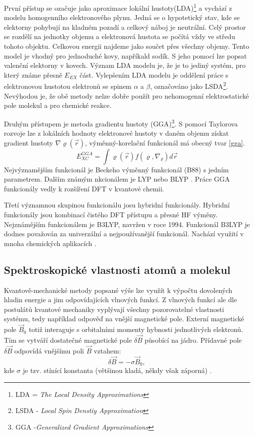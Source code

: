 \documentclass[
  digital, %
  table,   %
  lof,     %
  lot,     %
  oneside,
]{fithesis3}
\begin{document}
První přístup se ozačuje jako aproximace lokální hustoty(LDA)\footnote{LDA = \textit{The Local Density Approximations}} a vychází z modelu homogenního elektronového plynu. Jedná se o hypotetický stav, kde se elektorny pohybují na kladném pozadí a celkový náboj je neutrální. Celý prostor se rozdělí na jednotky objemu a elektronová hustota se počítá vždy ve středu tohoto objektu. Celkovou energii najdeme jako součet přes všechny objemy. Tento model je vhodný pro jednoduché kovy, napříkald sodík. S jeho pomocí lze popsat valenční elektorny v kovech. Význam LDA modelu je, že je to jediný systém, pro který známe přesně $E_{EX}$ část. Vylepšením LDA modelu je oddělení práce s elektronovou hustotou elektronů se spinem $\alpha$ a $\beta$, označováno jako LSDA\footnote{LSDA - \textit{Local Spin Denstiy Approximation}}. Nevýhodou je, že obě metody nelze dobře použít pro nehomogenní elektrostatické pole molekul a pro chemické reakce.

 Druhým přístupem je metoda gradientu hustoty (GGA)\footnote{GGA -\textit{Generalized Gradient Approximations}}. S pomocí Taylorova rozvoje lze z lokálních hodnoty elektronové hustoty v daném objemu získat gradient hustoty $\nabla \varrho(\vec{r})$, výměnný-korelační funkcionál má obecný tvar \ref{gga}.
\begin{equation}
  E_{XC}^{GGA} = \int \varrho(\vec{r})f(\varrho, \nabla_{\varrho})d\vec{r}
  \label{gga}
\end{equation}
 Nejvýznamějším funkcionál je Beckeho výměnný funkcionál (B88) s jedním parametrem. Dalším známým nkcionálem je LYP \cite{lyp} nebo BLYP \cite{blyp}. Práce GGA funkcionály vedly k rozšíření DFT v kvantové chemii.

 Třetí významnou skupinou funkcionálu josu hybridní funkcionály. Hybridní funkcionály jsou kombinací čistého DFT přístupu a přesné HF výměny. Nejznámějším funkcionálem je B3LYP, navržen v roce 1994. Funkcionál B3LYP je dodnes považován za univerzální a nejpoužívanější funkcionál. Nachází využití v mnoha chemických aplikacích \cite{koch2000chemist}.

 \subsection{Spektroskopické vlastnosti atomů a molekul}
 Kvantově-mechanické metody popsané výše lze využít k výpočtu dovolených hladin energie a jim odpovídajících vlnových funkcí. Z vlnových funkcí ale dle postulátů kvantové mechaniky vyplývají všechny pozorovatelné vlastnosti systému, tedy například odpověď na vnější magnetické pole. Externí magnetické pole $\vec{B}_0$ totiž interaguje s orbitalními momenty hybnosti jednotlivých elektronů. Tím se vytváří dostatečné magnetické pole $\delta \vec{B}$ působící na jádro. Přídavné pole $\delta \vec{B}$ odpovídá vnějšímu poli $\vec{B}$ vztahem:
\begin{equation}
  \delta \vec{B} = - \sigma \vec{B}_0,
\end{equation}
kde $\sigma$ je tzv. stínící konstanta (většinou kladá, někdy však záporná) \cite{atkins2010atkins}.
\end{document}
